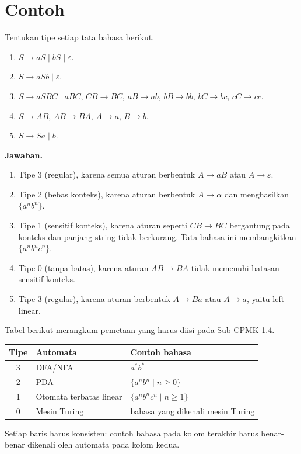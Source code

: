 \section*{Contoh}

\begin{contoh}
Tentukan tipe setiap tata bahasa berikut.
\begin{enumerate}[label=(\alph*),leftmargin=*]
  \item \(S \to aS \mid bS \mid \varepsilon\).
  \item \(S \to aSb \mid \varepsilon\).
  \item \(S \to aSBC \mid aBC\), \(CB \to BC\), \(aB \to ab\),
        \(bB \to bb\), \(bC \to bc\), \(cC \to cc\).
  \item \(S \to AB\), \(AB \to BA\), \(A \to a\), \(B \to b\).
  \item \(S \to Sa \mid b\).
\end{enumerate}
\textbf{Jawaban.}
\begin{enumerate}[label=(\alph*),leftmargin=*]
  \item Tipe 3 (regular), karena semua aturan berbentuk \(A \to aB\)
        atau \(A \to \varepsilon\).
  \item Tipe 2 (bebas konteks), karena aturan berbentuk
        \(A \to \alpha\) dan menghasilkan \(\{a^n b^n\}\).
  \item Tipe 1 (sensitif konteks), karena aturan seperti
        \(CB \to BC\) bergantung pada konteks dan panjang string tidak
        berkurang. Tata bahasa ini membangkitkan
        \(\{a^n b^n c^n\}\).
  \item Tipe 0 (tanpa batas), karena aturan \(AB \to BA\) tidak
        memenuhi batasan sensitif konteks.
  \item Tipe 3 (regular), karena aturan berbentuk \(A \to Ba\) atau
        \(A \to a\), yaitu left-linear.
\end{enumerate}
\end{contoh}

\begin{contoh}
Tabel berikut merangkum pemetaan yang harus diisi pada Sub-CPMK 1.4.
\begin{center}
\small
\begin{tabular}{@{}c l l@{}}
\toprule
\textbf{Tipe} & \textbf{Automata} & \textbf{Contoh bahasa} \\
\midrule
3 & DFA/NFA & \(a^{*}b^{*}\) \\
2 & PDA & \(\{a^n b^n \mid n \ge 0\}\) \\
1 & Otomata terbatas linear & \(\{a^n b^n c^n \mid n \ge 1\}\) \\
0 & Mesin Turing & bahasa yang dikenali mesin Turing \\
\bottomrule
\end{tabular}
\end{center}
Setiap baris harus konsisten: contoh bahasa pada kolom terakhir harus
benar-benar dikenali oleh automata pada kolom kedua.
\end{contoh}

